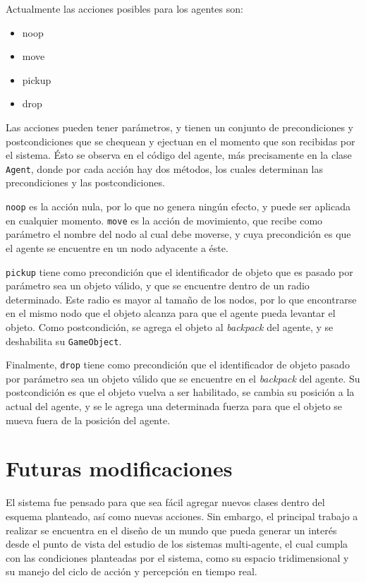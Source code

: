 \documentclass[a4paper,oneside]{article}
\begin{document}
Actualmente las acciones posibles para los agentes son:

\begin{itemize}
\ttfamily
\item noop
\item move
\item pickup
\item drop
\end{itemize}

Las acciones pueden tener parámetros, y tienen un conjunto de precondiciones
y postcondiciones que se chequean y ejectuan en el momento que son recibidas por
el sistema. Ésto se observa en el código del agente, más precisamente en la
clase \texttt{Agent}, donde por cada acción hay dos métodos, los cuales
determinan las precondiciones y las postcondiciones.

\texttt{noop} es la acción nula, por lo que no genera ningún efecto, y puede ser
aplicada en cualquier momento. \texttt{move} es la acción de movimiento, que
recibe como parámetro el nombre del nodo al cual debe moverse, y cuya
precondición es que el agente se encuentre en un nodo adyacente a éste.

\texttt{pickup} tiene como precondición que el identificador de objeto que es
pasado por parámetro sea un objeto válido, y que se encuentre dentro de un radio
determinado. Este radio es mayor al tamaño de los nodos, por lo que encontrarse
en el mismo nodo que el objeto alcanza para que el agente pueda levantar el
objeto. Como postcondición, se agrega el objeto al \textit{backpack} del agente,
y se deshabilita su \texttt{GameObject}.

Finalmente, \texttt{drop} tiene como precondición que el identificador de objeto
pasado por parámetro sea un objeto válido que se encuentre en el
\textit{backpack} del agente.  Su postcondición es que el objeto vuelva a ser
habilitado, se cambia su posición a la actual del agente, y se le agrega una
determinada fuerza para que el objeto se mueva fuera de la posición del agente.

\section{Futuras modificaciones}

El sistema fue pensado para que sea fácil agregar nuevos clases dentro del
esquema planteado, así como nuevas acciones. Sin embargo, el principal trabajo
a realizar se encuentra en el diseño de un mundo que pueda generar un interés
desde el punto de vista del estudio de los sistemas multi-agente, el cual cumpla
con las condiciones planteadas por el sistema, como su espacio tridimensional
y su manejo del ciclo de acción y percepción en tiempo real. 
\end{document}
